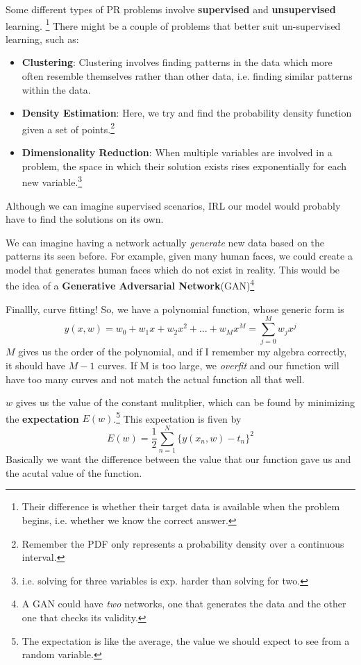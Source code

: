 \documentclass{tufte-handout}
\begin{document}
	Some different types of PR problems involve \textbf{supervised} and
	\textbf{unsupervised} learning. \footnote{Their difference is whether their 
	target data is available when the problem begins, i.e. whether we know
	the correct answer.} There might be a couple of problems that better suit 
	un-supervised learning, such as:
	\begin{itemize}
		\item{\textbf{Clustering}}: Clustering involves finding patterns in the 
				data which more often resemble themselves rather than other data,
				i.e. finding similar patterns within the data. 
		\item{\textbf{Density Estimation}}: Here, we try and find the probability 
				density function given a set of points.\footnote{Remember the PDF
				only represents a probability density over a continuous interval.}
		\item{\textbf{Dimensionality Reduction}}: When multiple variables are involved
				in a problem, the space in which their solution exists rises exponentially
				for each new variable.\footnote{i.e. solving for three variables is exp. 
				harder than solving for two.} 
	\end{itemize}
	Although we can imagine supervised scenarios, IRL our model would probably have to find
	the solutions on its own. 

	We can imagine having a network actually \textit{generate} new data based on the patterns
	its seen before. For example, given many human faces, we could create a model that generates
	human faces which do not exist in reality. This would be the idea of a \textbf{Generative
	Adversarial Network}(GAN)\footnote{A GAN could have \textit{two} networks, one that generates
	the data and the other one that checks its validity.}

	Finallly, curve fitting! So, we have a polynomial function, whose generic form is
		\[ y(x,w)= w_{0}+w_{1}x+w_{2}x^{2}+...+ w_{M}x^{M} = \sum_{j=0}^{M}w_{j}x^{j}\]
	$M$ gives us the  order of the polynomial, and if I remember my algebra correctly, it 
	should have $M-1$ curves.  If M is too large, we \textit{overfit} and our function
	will have too many curves and not match the actual function all that well.

	$w$ gives us the value of the constant mulitplier, which can be found by minimizing the 
	\textbf{expectation} $E(w)$.\footnote{The expectation is like the average, the value 
	we should expect to see from a random variable.} This expectation is fiven by 
	\[E(w)=\frac{1}{2}\sum_{n=1}^{N} \{y(x_{n},w)-t_{n}\}^{2} \]
	Basically we want the difference between the value that our function gave us and the 
	acutal value of the function.
\end{document}
